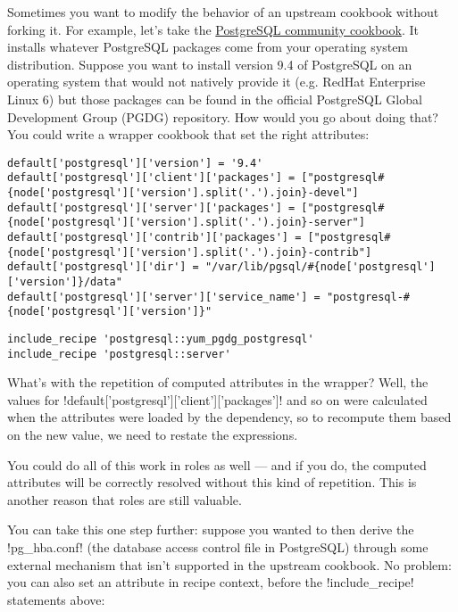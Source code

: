 Sometimes you want to modify the behavior of an upstream cookbook without forking it. For example, let's take the \href{http://community.opscode.com/cookbooks/postgresql}{PostgreSQL community cookbook}. It installs whatever PostgreSQL packages come from your operating system distribution. Suppose you want to install version 9.4 of PostgreSQL on an operating system that would not natively provide it (e.g. RedHat Enterprise Linux 6) but those packages can be found in the official PostgreSQL Global Development Group (PGDG) repository. How would you go about doing that? You could write a wrapper cookbook that set the right attributes:

\begin{lstlisting}[label=lst:wrapper-cookbook3,caption=acmeco-postgresql/attributes/default.rb]
default['postgresql']['version'] = '9.4'
default['postgresql']['client']['packages'] = ["postgresql#{node['postgresql']['version'].split('.').join}-devel"]
default['postgresql']['server']['packages'] = ["postgresql#{node['postgresql']['version'].split('.').join}-server"]
default['postgresql']['contrib']['packages'] = ["postgresql#{node['postgresql']['version'].split('.').join}-contrib"]
default['postgresql']['dir'] = "/var/lib/pgsql/#{node['postgresql']['version']}/data"
default['postgresql']['server']['service_name'] = "postgresql-#{node['postgresql']['version']}"
\end{lstlisting}

\begin{lstlisting}[label=lst:wrapper-cookbook4,caption=acmeco-postgresql/recipes/default.rb]
include_recipe 'postgresql::yum_pgdg_postgresql'
include_recipe 'postgresql::server'
\end{lstlisting}

What's with the repetition of computed attributes in the wrapper? Well, the values for \inline!default['postgresql']['client']['packages']! and so on were calculated when the attributes were loaded by the dependency, so to recompute them based on the new value, we need to restate the expressions.

You could do all of this work in roles as well — and if you do, the computed attributes will be correctly resolved without this kind of repetition. This is another reason that roles are still valuable.

You can take this one step further: suppose you wanted to then derive the \inline!pg_hba.conf! (the database access control file in PostgreSQL) through some external mechanism that isn't supported in the upstream cookbook. No problem: you can also set an attribute in recipe context, before the \inline!include_recipe! statements above:

